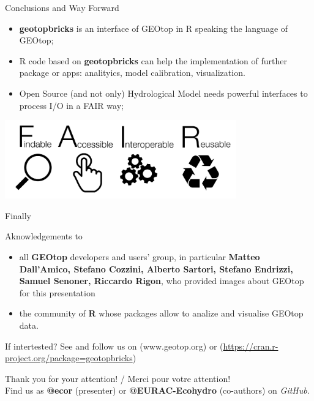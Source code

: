 \documentclass[ignorenonframetext,]{beamer}
\providecommand{\tightlist}{%
  \setlength{\itemsep}{0pt}\setlength{\parskip}{0pt}}
\begin{document}
\begin{frame}{Conclusions and Way Forward}

\begin{itemize}
\item
  \textbf{geotopbricks} is an interface of GEOtop in R speaking the
  language of GEOtop;
\item
  R code based on \textbf{geotopbricks} can help the implementation of
  further package or apps: analityics, model calibration, visualization.
\item
  Open Source (and not only) Hydrological Model needs powerful
  interfaces to process I/O in a FAIR way;
\end{itemize}

\includegraphics[width=0.75000\textwidth]{resources/images/FAIR_data_principles.jpg}\\

\end{frame}

\begin{frame}{Finally}

Aknowledgements to

\begin{itemize}
\tightlist
\item
  all \textbf{GEOtop} developers and users' group, in particular
  \textbf{Matteo Dall'Amico, Stefano Cozzini, Alberto Sartori, Stefano
  Endrizzi, Samuel Senoner, Riccardo Rigon}, who provided images about
  GEOtop for this presentation
\item
  the community of \textbf{R} whose packages allow to analize and
  visualise GEOtop data.
\end{itemize}

If intertested? See and follow us on (www.geotop.org) or
(\url{https://cran.r-project.org/package=geotopbricks})

Thank you for your attention! / Merci pour votre attention!\\
Find us as \textbf{@ecor} (presenter) or \textbf{@EURAC-Ecohydro}
(co-authors) on \emph{GitHub}.

\end{frame}
\end{document}
